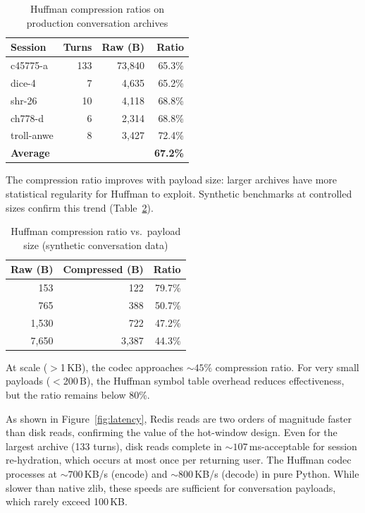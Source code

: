 \documentclass[conference]{IEEEtran}
\begin{document}
\begin{table}[h]
\centering
\caption{Huffman compression ratios on production conversation archives}
\label{tab:compression}
\begin{tabular}{lrrr}
\toprule
\textbf{Session} & \textbf{Turns} & \textbf{Raw (B)} & \textbf{Ratio} \\
\midrule
c45775-a & 133 & 73{,}840 & 65.3\% \\
dice-4 & 7 & 4{,}635 & 65.2\% \\
shr-26 & 10 & 4{,}118 & 68.8\% \\
ch778-d & 6 & 2{,}314 & 68.8\% \\
troll-anwe & 8 & 3{,}427 & 72.4\% \\
\midrule
\textbf{Average} & & & \textbf{67.2\%} \\
\bottomrule
\end{tabular}
\end{table}

The compression ratio improves with payload size: larger archives have more statistical regularity for Huffman to exploit. Synthetic benchmarks at controlled sizes confirm this trend (Table~\ref{tab:compression_scaling}).

\begin{table}[h]
\centering
\caption{Huffman compression ratio vs.\ payload size (synthetic conversation data)}
\label{tab:compression_scaling}
\begin{tabular}{rrr}
\toprule
\textbf{Raw (B)} & \textbf{Compressed (B)} & \textbf{Ratio} \\
\midrule
153 & 122 & 79.7\% \\
765 & 388 & 50.7\% \\
1{,}530 & 722 & 47.2\% \\
7{,}650 & 3{,}387 & 44.3\% \\
\bottomrule
\end{tabular}
\end{table}

At scale ($>$1\,KB), the codec approaches ${\sim}45\%$ compression ratio. For very small payloads ($<$200\,B), the Huffman symbol table overhead reduces effectiveness, but the ratio remains below 80\%.

As shown in Figure~\ref{fig:latency}, Redis reads are two orders of magnitude faster than disk reads, confirming the value of the hot-window design. Even for the largest archive (133 turns), disk reads complete in ${\sim}107$\,ms-acceptable for session re-hydration, which occurs at most once per returning user. The Huffman codec processes at ${\sim}700$\,KB/s (encode) and ${\sim}800$\,KB/s (decode) in pure Python. While slower than native zlib, these speeds are sufficient for conversation payloads, which rarely exceed 100\,KB.
\end{document}

